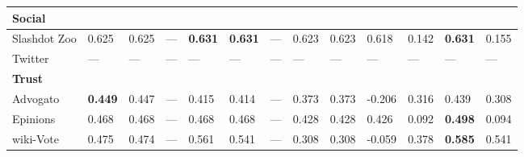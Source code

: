 \begin{longtable}{ lllllllllllll }
\hline
\multicolumn{13}{|l|}{\textbf{Social}} \\
\hline
Slashdot Zoo      & 0.625 & 0.625 & --- & \bf{0.631} & \bf{0.631} & --- & 0.623 & 0.623 & 0.618 & 0.142 & \bf{0.631} & 0.155 \\
Twitter           & --- & --- & --- & --- & --- & --- & --- & --- & --- & --- & --- & --- \\

\hline
\multicolumn{13}{|l|}{\textbf{Trust}} \\
\hline
Advogato          & \bf{0.449} & 0.447 & --- & 0.415 & 0.414 & --- & 0.373 & 0.373 & -0.206 & 0.316 & 0.439 & 0.308 \\
Epinions          & 0.468 & 0.468 & --- & 0.468 & 0.468 & --- & 0.428 & 0.428 & 0.426 & 0.092 & \bf{0.498} & 0.094 \\
wiki-Vote         & 0.475 & 0.474 & --- & 0.561 & 0.541 & --- & 0.308 & 0.308 & -0.059 & 0.378 & \bf{0.585} & 0.541 \\

      \hline
    \end{longtable} 

